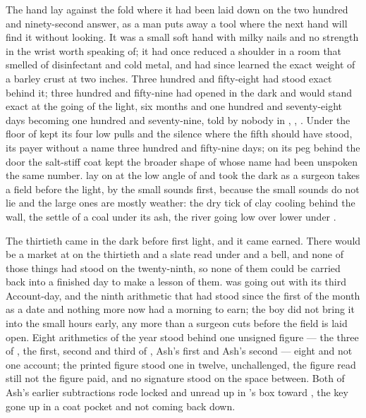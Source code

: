 
The hand lay against the fold where it had been laid down on the two hundred and ninety-second answer, as a man puts away a tool where the next hand will find it without looking. It was a small soft hand with milky nails and no strength in the wrist worth speaking of; it had once reduced a shoulder in a room that smelled of disinfectant and cold metal, and had since learned the exact weight of a barley crust at two inches. Three hundred and fifty-eight had stood exact behind it; three hundred and fifty-nine had opened in the dark and would stand exact at the going of the light, six months and one hundred and seventy-eight days becoming one hundred and seventy-nine, told by nobody in , , . Under the floor of   kept its four low pulls and the silence where the fifth should have stood, its payer without a name three hundred and fifty-nine days; on its peg behind the door the salt-stiff coat kept the broader shape of  whose name had been unspoken the same number.  lay on  at the low angle of  and took the dark as a surgeon takes a field before the light, by the small sounds first, because the small sounds do not lie and the large ones are mostly weather: the dry tick of clay cooling behind the wall, the settle of a coal under its ash, the river going low over lower under .

The thirtieth came in the dark before first light, and it came earned. There would be a market at  on the thirtieth and a slate read under  and a bell, and none of those things had stood on the twenty-ninth, so none of them could be carried back into a finished day to make a lesson of them.  was going out with its third Account-day, and the ninth arithmetic that had stood since the first of the month as a date and nothing more now had a morning to earn; the boy did not bring it into the small hours early, any more than a surgeon cuts before the field is laid open. Eight arithmetics of the year stood behind one unsigned figure --- the three of , the first, second and third of , Ash's first and Ash's second --- eight and not one account; the printed figure stood one in twelve, unchallenged, the figure read still not the figure paid, and no signature stood on the space between. Both of Ash's earlier subtractions rode locked and unread up  in 's box toward , the key gone up in a coat pocket and not coming back down.


